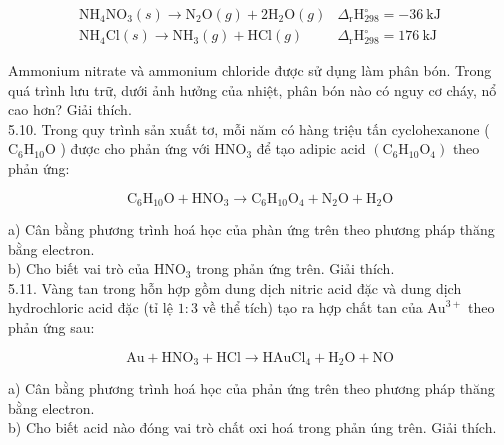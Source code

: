 \documentclass[10pt]{article}
\begin{document}
$$
\begin{array}{ll}
\mathrm{NH}_{4} \mathrm{NO}_{3}(s) \rightarrow \mathrm{N}_{2} \mathrm{O}(g)+2 \mathrm{H}_{2} \mathrm{O}(g) & \Delta_{\mathrm{r}} \mathrm{H}_{298}^{\circ}=-36 \mathrm{~kJ} \\
\mathrm{NH}_{4} \mathrm{Cl}(s) \rightarrow \mathrm{NH}_{3}(g)+\mathrm{HCl}(g) & \Delta_{\mathrm{r}} \mathrm{H}_{298}^{\circ}=176 \mathrm{~kJ}
\end{array}
$$

Ammonium nitrate và ammonium chloride được sử dụng làm phân bón. Trong quá trình lưu trữ, dưới ảnh hưởng của nhiệt, phân bón nào có nguy cơ cháy, nổ cao hơn? Giải thích.\\
5.10. Trong quy trình sản xuất tơ, mỗi năm có hàng triệu tấn cyclohexanone ( $\mathrm{C}_{6} \mathrm{H}_{10} \mathrm{O}$ ) được cho phản ứng với $\mathrm{HNO}_{3}$ để tạo adipic acid $\left(\mathrm{C}_{6} \mathrm{H}_{10} \mathrm{O}_{4}\right)$ theo phản ứng:

$$
\mathrm{C}_{6} \mathrm{H}_{10} \mathrm{O}+\mathrm{HNO}_{3} \rightarrow \mathrm{C}_{6} \mathrm{H}_{10} \mathrm{O}_{4}+\mathrm{N}_{2} \mathrm{O}+\mathrm{H}_{2} \mathrm{O}
$$

a) Cân bằng phương trình hoá học của phàn ứng trên theo phương pháp thăng bằng electron.\\
b) Cho biết vai trò của $\mathrm{HNO}_{3}$ trong phản ứng trên. Giải thích.\\
5.11. Vàng tan trong hỗn hợp gồm dung dịch nitric acid đặc và dung dịch hydrochloric acid đặc (tỉ lệ $1: 3$ về thể tích) tạo ra hợp chất tan của $\mathrm{Au}^{3+}$ theo phản ứng sau:

$$
\mathrm{Au}+\mathrm{HNO}_{3}+\mathrm{HCl} \rightarrow \mathrm{HAuCl}_{4}+\mathrm{H}_{2} \mathrm{O}+\mathrm{NO}
$$

a) Cân bằng phương trình hoá học của phản ứng trên theo phương pháp thăng bằng electron.\\
b) Cho biết acid nào đóng vai trò chất oxi hoá trong phản úng trên. Giải thích.
\end{document}
